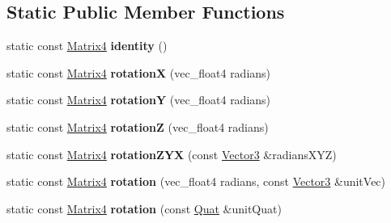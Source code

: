 \subsection*{Static Public Member Functions}
\begin{DoxyCompactItemize}
\item 
\hypertarget{classVectormath_1_1Soa_1_1Matrix4_a194f3a3b449744f9073da0c20fc4a0c0}{static const \hyperlink{classVectormath_1_1Soa_1_1Matrix4}{Matrix4} {\bfseries identity} ()}\label{classVectormath_1_1Soa_1_1Matrix4_a194f3a3b449744f9073da0c20fc4a0c0}

\item 
\hypertarget{classVectormath_1_1Soa_1_1Matrix4_a27c53341ef43658301b616011b5042d2}{static const \hyperlink{classVectormath_1_1Soa_1_1Matrix4}{Matrix4} {\bfseries rotation\-X} (vec\-\_\-float4 radians)}\label{classVectormath_1_1Soa_1_1Matrix4_a27c53341ef43658301b616011b5042d2}

\item 
\hypertarget{classVectormath_1_1Soa_1_1Matrix4_a228cd5f0c11d9e3dad3bd872a429d21d}{static const \hyperlink{classVectormath_1_1Soa_1_1Matrix4}{Matrix4} {\bfseries rotation\-Y} (vec\-\_\-float4 radians)}\label{classVectormath_1_1Soa_1_1Matrix4_a228cd5f0c11d9e3dad3bd872a429d21d}

\item 
\hypertarget{classVectormath_1_1Soa_1_1Matrix4_a0c2fc1a1ba68a078148a20e8091616e0}{static const \hyperlink{classVectormath_1_1Soa_1_1Matrix4}{Matrix4} {\bfseries rotation\-Z} (vec\-\_\-float4 radians)}\label{classVectormath_1_1Soa_1_1Matrix4_a0c2fc1a1ba68a078148a20e8091616e0}

\item 
\hypertarget{classVectormath_1_1Soa_1_1Matrix4_a9e400b8c9a368d784a586750e7aa4143}{static const \hyperlink{classVectormath_1_1Soa_1_1Matrix4}{Matrix4} {\bfseries rotation\-Z\-Y\-X} (const \hyperlink{classVectormath_1_1Soa_1_1Vector3}{Vector3} \&radians\-X\-Y\-Z)}\label{classVectormath_1_1Soa_1_1Matrix4_a9e400b8c9a368d784a586750e7aa4143}

\item 
\hypertarget{classVectormath_1_1Soa_1_1Matrix4_aee83e8633869bc4d6258f4b1c5146f5e}{static const \hyperlink{classVectormath_1_1Soa_1_1Matrix4}{Matrix4} {\bfseries rotation} (vec\-\_\-float4 radians, const \hyperlink{classVectormath_1_1Soa_1_1Vector3}{Vector3} \&unit\-Vec)}\label{classVectormath_1_1Soa_1_1Matrix4_aee83e8633869bc4d6258f4b1c5146f5e}

\item 
\hypertarget{classVectormath_1_1Soa_1_1Matrix4_ae6ed4a59720b7b49cd36e63e77ff54b0}{static const \hyperlink{classVectormath_1_1Soa_1_1Matrix4}{Matrix4} {\bfseries rotation} (const \hyperlink{classVectormath_1_1Soa_1_1Quat}{Quat} \&unit\-Quat)}\label{classVectormath_1_1Soa_1_1Matrix4_ae6ed4a59720b7b49cd36e63e77ff54b0}


\end{DoxyCompactItemize}
